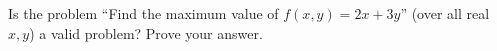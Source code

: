 Is the problem ``Find the maximum value of $f(x,y)=2x+3y$'' (over all real $x,y$) a valid problem? Prove your answer.

